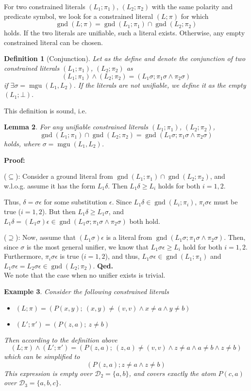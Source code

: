 \documentclass[a4paper]{article}
\newcommand{\mGnd}{\operatorname{gnd}} \newcommand{\mLVar}{\operatorname{lvar}} \newcommand{\mRVar}{\operatorname{rvar}} \newcommand{\mDmn}{\operatorname{dom}} \newcommand{\mRng}{\operatorname{rng}} \newcommand{\mMGU}{\operatorname{mgu}} \newcommand{\mDef}{\operatorname{def}} \newcommand{\mDomain}{\mathcal{D}} \newcommand{\mVar}{\operatorname{var}}
\newcommand{\startproof}{{\bf Proof:~}}
\newcommand{\finishproof}{{\bf Qed.}}
\newcommand{\leaveabit}{\\[6 pt]}
\newtheorem{defi}{Definition}[section]
\newtheorem{example}[defi]{Example}
\newtheorem{lemm}[defi]{Lemma}
\begin{document}
For two constrained literals $(L_1; \pi_1)$, $(L_2; \pi_2)$ with the same polarity and predicate symbol, we look for a constrained literal $(L; \pi)$ for which
\[\mGnd(L; \pi) = \mGnd(L_1; \pi_1) \cap \mGnd(L_2; \pi_2)\]
holds. If the two literals are unifiable,   
such a literal exists. Otherwise, any empty constrained literal can be chosen.

\begin{defi}[Conjunction] 
Let as the define and denote \emph{the conjunction of two constrained literals $(L_1; \pi_1)$, $(L_2; \pi_2)$} as
\[(L_1; \pi_1) \land (L_2; \pi_2) = (L_1\sigma; \pi_1\sigma \land \pi_2\sigma)\]
if $\exists \sigma = \mMGU(L_1, L_2)$. If the literals are not unifiable, we define it as the empty $(L_1; \bot)$.
\end{defi}

\noindent
This definition is sound, i.e.\

\begin{lemm} For any unifiable constrained literals $(L_1; \pi_1)$, $(L_2; \pi_2)$,
\[\mGnd(L_1; \pi_1) \cap \mGnd(L_2; \pi_2) = \mGnd(L_1\sigma; \pi_1\sigma \land \pi_2\sigma)\]
holds, where $\sigma = \mMGU(L_1, L_2)$.
\end{lemm}

\noindent
\startproof 

($\subseteq$): Consider a ground literal from $\mGnd(L_1; \pi_1) \cap \mGnd(L_2; \pi_2)$, and w.l.o.g. assume it has the form $L_1\delta$. 
Then $L_1\delta \geq L_i$ holds for both $i= 1,2$.

Thus, $\delta = \sigma\epsilon$ for some substitution $\epsilon$.  Since $L_1\delta \in \mGnd(L_i; \pi_i)$, $\pi_i\sigma\epsilon$ must be true ($i = 1,2$).
But then $L_1\delta \geq L_1\sigma$, and $L_1\delta = (L_1\sigma)\epsilon \in \mGnd(L_1\sigma; \pi_1\sigma \land \pi_2\sigma)$ both hold.

($\supseteq$): Now, assume that $(L_1\sigma)\epsilon$ is a literal from $\mGnd(L_1\sigma; \pi_1\sigma \land \pi_2\sigma)$.
Then, since $\sigma$ is the most general unifier, we know that $L_1\sigma\epsilon \geq L_i$ hold for both $i = 1,2$.
Furthermore, $\pi_i\sigma\epsilon$ is true ($i = 1,2$), and thus, $L_1\sigma\epsilon \in \mGnd(L_1; \pi_1)$ and 
$L_1\sigma\epsilon = L_2\sigma\epsilon \in \mGnd(L_2; \pi_2)$.
\finishproof\leaveabit\noindent
We note that the case when no unifier exists is trivial.

\begin{example} Consider the following constrained literals
	\begin{itemize}
		\item $(L; \pi) = (P(x,y);~(x,y) \ne (v,v) \land x \ne a \land y \ne b)$
		\item $(L'; \pi') = (P(z,a);~z \ne b)$
	\end{itemize}
Then according to the definition above
\[(L; \pi) \land (L'; \pi') = (P(z,a);~(z,a) \ne (v,v) \land z \ne a \land a \ne b \land z \ne b)\]
which can be simplified to
\[(P(z,a); z \ne a \land z \ne b)\]
This expression is empty over $\mDomain_2 = \{a,b\}$, and covers exactly the atom $P(c,a)$ over $\mDomain_3 = \{ a,b,c \}$.
\end{example}
\end{document}
